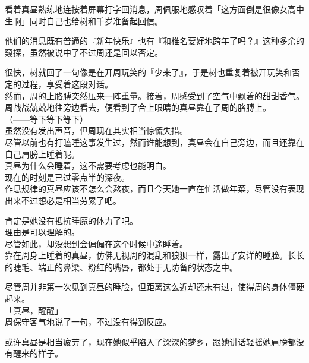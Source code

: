 看着真昼熟练地连按着屏幕打字回消息，周佩服地感叹着「这方面倒是很像女高中生啊」同时自己也给树和千岁准备起回信。

他们的消息既有普通的『新年快乐』也有『和椎名要好地跨年了吗？』这种多余的窥探，虽然被说中了不过周还是回以否定。

很快，树就回了一句像是在开周玩笑的『少来了』，于是树也重复着被开玩笑和否定的过程，享受着这段对话。\\

然而，周的上胳膊突然压来一阵重量。接着，周感受到了空气中飘着的甜甜香气。\\

周战战兢兢地往旁边看去，便看到了合上眼睛的真昼靠在了周的胳膊上。\\

（——等下等下等下）\\

虽然没有发出声音，但周现在其实相当惊慌失措。\\

尽管以前也有打瞌睡这事发生过，然而谁能想到，真昼会在自己旁边，而且还靠在自己肩膀上睡着呢。\\

真昼为什么会睡着，这不需要考虑也能明白。\\

现在的时刻是已过零点半的深夜。\\

作息规律的真昼应该不怎么会熬夜，而且今天她一直在忙活做年菜，尽管没有表现出来不过想必是相当劳累了吧。

肯定是她没有抵抗睡魔的体力了吧。\\

理由是可以理解的。\\

尽管如此，却没想到会偏偏在这个时候中途睡着。\\

靠在周身上睡着的真昼，仿佛无视周的混乱和狼狈一样，露出了安详的睡脸。长长的睫毛、端正的鼻梁、粉红的嘴唇，都处于无防备的状态之中。

尽管周并非第一次见到真昼的睡脸，但距离这么近却还未有过，使得周的身体僵硬起来。\\

「真昼，醒醒」\\

周保守客气地说了一句，不过没有得到反应。

或许真昼是相当疲劳了，现在她似乎陷入了深深的梦乡，跟她讲话轻摇她肩膀都没有醒来的样子。\\

